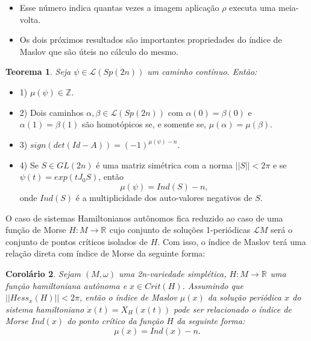 \documentclass{beamer}
\newtheorem{teorema}{Teorema}[section]
\newtheorem{corolario}[teorema]{Corolário}
\newcommand{\caminhos}{\mathcal{L}}
\newcommand{\caminhossempontobase}[1]{\caminhos(#1)}
\newcommand{\estruturacomplexa}{J_{0}}
\newcommand{\gruposimpletico}[1]{Sp(#1)}
\newcommand{\inteiros}{\mathbb{Z}}
\newcommand{\real}[1]{\mathbb{R}^{#1}}
\newcommand{\lacocontrateis}{\mathcal{L}M}
\begin{document}
\begin{frame}
	\begin{itemize}
		\item 
		Esse número indica quantas vezes a imagem aplicação $\rho$ executa uma meia-volta.
		
		\item  Os dois próximos resultados são importantes propriedades do índice de Maslov que são úteis no cálculo do mesmo.
	\end{itemize}
	
	\begin{teorema}
		Seja $\psi\in \caminhossempontobase{\gruposimpletico{2n}} $ um caminho contínuo. Então:
	\end{teorema}
	\begin{itemize}
		
		\item 1) $\mu(\psi) \in \inteiros$.
		\item 2) Dois caminhos $\alpha, \beta \in \caminhossempontobase{\gruposimpletico{2n}} $ com $\alpha(0) = \beta(0)$ e $\alpha(1) = \beta(1)$ são homotópicos se, e somente se, $\mu(\alpha) = \mu(\beta)$.
		\item 3) $sign(det(Id - A)) = (-1)^{\mu(\psi)-n}$.
		\item 4) Se $S \in GL(2n)$ é uma matriz simétrica com a norma $||S|| < 2\pi$ e se $\psi(t) = exp(t\estruturacomplexa S)$, então 
		$$
		\mu(\psi) = Ind(S) - n,
		$$
		onde $Ind(S)$ é a multiplicidade dos auto-valores negativos de $S$.
	\end{itemize}
\end{frame}


\begin{frame}
	O caso de sistemas Hamiltonianos autônomos fica reduzido ao caso de uma função de Morse $H:M\to \real{}$ cujo conjunto de soluções 1-periódicas $\lacocontrateis$ será o conjunto de pontos críticos isolados de $H$. Com isso, o índice de Maslov terá uma relação direta com índice de Morse da seguinte forma:
	
	\begin{corolario}
		Sejam $(M, \omega)$ uma 2n-variedade simplética, $H : M \to \real{}$ uma função hamiltoniana autônoma e $x \in Crit(H)$. Assumindo que $||Hess_{x}(H)|| < 2\pi$, então o índice de Maslov $\mu(x)$ da solução periódica $x$ do sistema hamiltoniano $\dot{x}(t) = X_{H}(x(t))$ pode ser relacionado o índice de Morse $Ind(x)$ do ponto crítico da função $H$ da seguinte forma:
		$$
		\mu(x) = Ind(x) - n.
		$$
	\end{corolario}
\end{frame}
\end{document}
